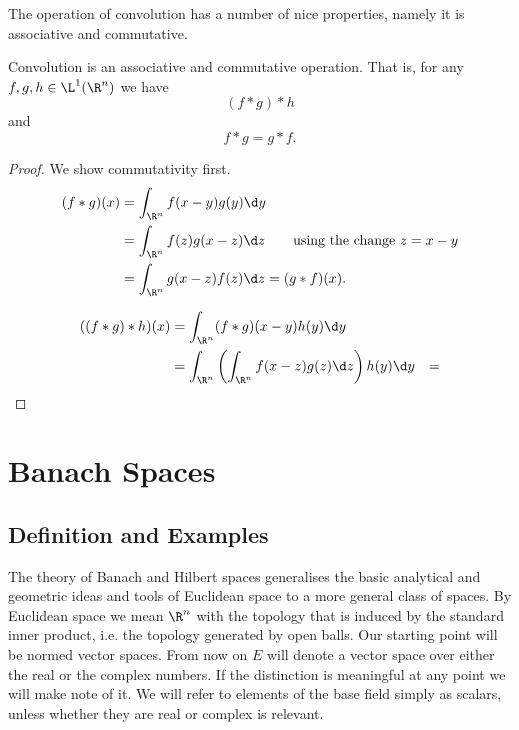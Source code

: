\documentclass[12pt,oneside]{book}
\begin{document}
The operation of convolution has a number of nice properties, namely it is associative and
commutative.
\begin{proposition}
	Convolution is an associative and commutative operation. That is, for any \( f, g, h \in
	\L^1(\R^n) \) we have
	\begin{equation*}
		(f \ast g) \ast h
	\end{equation*}
	and
	\begin{equation*}
		f \ast g = g \ast f.
	\end{equation*}
\end{proposition}
\begin{proof}
	We show commutativity first.
	\begin{align*}
		(f \ast g)(x) & = \int_{\R^n} f(x - y)g(y) \d y \\
									& = \int_{\R^n} f(z)g(x - z) \d z	\tag*{using the change \( z = x -y
									\)} \\
									& = \int_{\R^n} g(x - z)f(z) \d z = (g \ast f)(x).
	\end{align*}

	\begin{align*}
		((f \ast g) \ast h)(x) & = \int_{\R^n} (f \ast g)(x - y) h(y) \d y \\
													 & = \int_{\R^n} \left(\int_{\R^n} f(x - z)g(z) \d z\right) h(y) \d y
													 & = 
	\end{align*}

\end{proof}

\part{Banach Spaces}
\chapter{Definition and Examples}
The theory of Banach and Hilbert spaces generalises the basic analytical and geometric
ideas and tools of Euclidean space to a more general class of spaces. By Euclidean space
we mean \( \R^n \) with the topology that is induced by the standard inner product, i.e.
the topology generated by open balls. Our starting point will be normed vector spaces.
From now on \( E \) will denote a vector space over either the real or the complex
numbers. If the distinction is meaningful at any point we will make note of it. We will
refer to elements of the base field simply as scalars, unless whether they are real or
complex is relevant.
\end{document}
